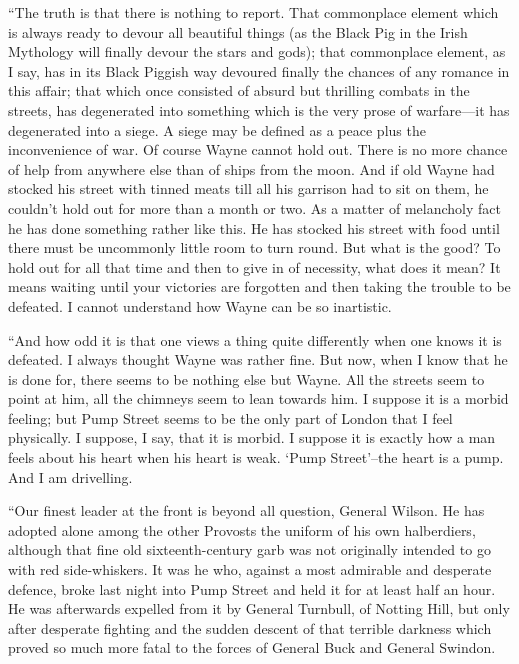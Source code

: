 \documentclass{book}
\begin{document}
“The truth is that there is nothing to report. That commonplace element which is always ready to devour all beautiful things (as the Black Pig in the Irish Mythology will finally devour the stars and gods); that commonplace element, as I say, has in its Black Piggish way devoured finally the chances of any romance in this affair; that which once consisted of absurd but thrilling combats in the streets, has degenerated into something which is the very prose of warfare—it has degenerated into a siege. A siege may be defined as a peace plus the inconvenience of war. Of course Wayne cannot hold out. There is no more chance of help from anywhere else than of ships from the moon. And if old Wayne had stocked his street with tinned meats till all his garrison had to sit on them, he couldn’t hold out for more than a month or two. As a matter of melancholy fact he has done something rather like this. He has stocked his street with food until there must be uncommonly little room to turn round. But what is the good? To hold out for all that time and then to give in of necessity, what does it mean? It means waiting until your victories are forgotten and then taking the trouble to be defeated. I cannot understand how Wayne can be so inartistic.

“And how odd it is that one views a thing quite differently when one knows it is defeated. I always thought Wayne was rather fine. But now, when I know that he is done for, there seems to be nothing else but Wayne. All the streets seem to point at him, all the chimneys seem to lean towards him. I suppose it is a morbid feeling; but Pump Street seems to be the only part of London that I feel physically. I suppose, I say, that it is morbid. I suppose it is exactly how a man feels about his heart when his heart is weak. ‘Pump Street’–the heart is a pump. And I am drivelling.

“Our finest leader at the front is beyond all question, General Wilson. He has adopted alone among the other Provosts the uniform of his own halberdiers, although that fine old sixteenth-century garb was not originally intended to go with red side-whiskers. It was he who, against a most admirable and desperate defence, broke last night into Pump Street and held it for at least half an hour. He was afterwards expelled from it by General Turnbull, of Notting Hill, but only after desperate fighting and the sudden descent of that terrible darkness which proved so much more fatal to the forces of General Buck and General Swindon.
\end{document}
